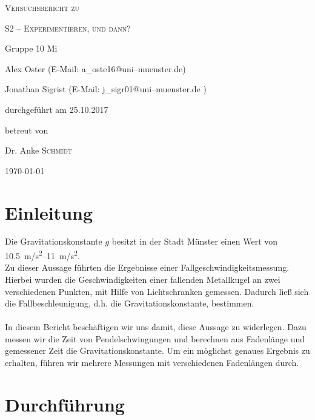 \documentclass[11pt,a4paper,titlepage, ngerman]{article}
\begin{document}
	\setlength{\parindent}{0em} 
	
	\begin{titlepage}
		\centering
		{\scshape\LARGE Versuchsbericht zu \par}
		\vspace{1cm}
		{\scshape\huge S2 -- Experimentieren, und dann?\par}
		\vspace{2.5cm}
		{\LARGE Gruppe 10 Mi\par}
		\vspace{0.5cm}
		{\large Alex Oster (E-Mail: a\_oste16@uni--muenster.de) \par}
		{\large Jonathan Sigrist (E-Mail: j\_sigr01@uni--muenster.de ) \par}
		\vfill
		durchgeführt am 25.10.2017\par
		betreut von\par
		{\large Dr. Anke \textsc{Schmidt}}
		
		\vfill
		
		{\large \today\par}
	\end{titlepage}
		
	\tableofcontents
	
	\newpage
	
	\section{Einleitung}
		\label{Einleitung}
		
		
		\glqq Die Gravitationskonstante $g$ besitzt in der Stadt Münster einen Wert von \SIrange{10,5}{11}{m/s^2}.\grqq
		\\
		Zu dieser Aussage führten die Ergebnisse einer Fallgeschwindigkeitsmessung. Hierbei wurden die Geschwindigkeiten einer fallenden Metallkugel an zwei verschiedenen Punkten, mit Hilfe von Lichtschranken gemessen. Dadurch ließ sich die Fallbeschleunigung, d.h. die Gravitationskonstante, bestimmen.  
		\\
		\\
		In diesem Bericht beschäftigen wir uns damit, diese Aussage zu widerlegen.
		Dazu messen wir die Zeit von Pendelschwingungen und berechnen aus Fadenlänge und gemessener Zeit die Gravitationskonstante. Um ein möglichst genaues Ergebnis zu erhalten, führen wir mehrere Messungen mit verschiedenen Fadenlängen durch.
		
	\section{Durchführung}
		\label{Durchführung}
		
\end{document}
